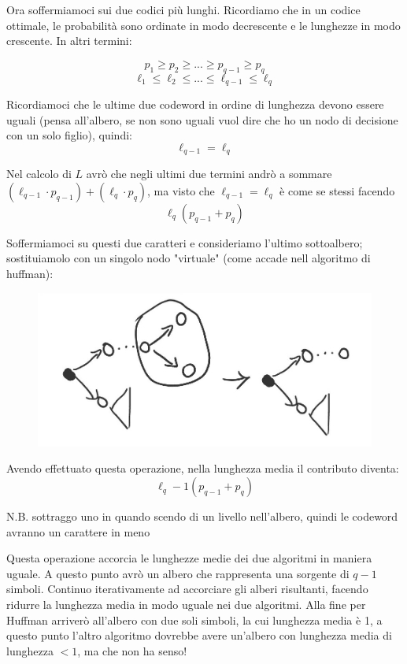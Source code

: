 \begin{dimostrazione}
	Ora soffermiamoci sui due codici più lunghi. Ricordiamo che in un codice ottimale, le probabilità sono ordinate in modo decrescente e le lunghezze in modo crescente. In altri termini:
	
	\begin{equation*}
	p_1 \geq p_2 \geq ... \geq p_{q-1} \geq p_q
	\end{equation*}
		\begin{equation*}
	\ell_1 \leq \ell_2 \leq ... \leq \ell_{q-1} \leq \ell_q
	\end{equation*}
	
	Ricordiamoci che le ultime due codeword in ordine di lunghezza devono essere uguali (pensa all'albero, se non sono uguali vuol dire che ho un nodo di decisione con un solo figlio), quindi:
	\begin{equation*}
	\ell_{q-1} = \ell_{q}
	\end{equation*}
	

	
	Nel calcolo di $L$ avrò che negli ultimi due termini andrò a sommare\\ $(\ell_{q-1} \cdot p_{q-1}) + (\ell_q \cdot p_q)$, ma visto che $\ell_{q-1} = \ell_{q}$ è come se stessi facendo
	\begin{equation*}
	\ell_q(p_{q-1} + p_q)
	\end{equation*}
	
		Soffermiamoci su questi due caratteri e consideriamo l'ultimo sottoalbero; sostituiamolo con un singolo nodo "virtuale" (come accade nell algoritmo di huffman):
	\begin{figure}[h]
		\centering
		\includegraphics[width=0.7\linewidth]{immagini/img21}
	\end{figure}

	Avendo effettuato questa operazione, nella lunghezza media il contributo diventa:
	\begin{equation*}
	\ell_q - 1(p_{q-1} + p_q)
	\end{equation*}
	\begin{center}
		\footnotesize N.B. sottraggo uno in quando scendo di un livello nell'albero, quindi le codeword avranno un carattere in meno
		\normalsize
	\end{center}
	Questa operazione accorcia le lunghezze medie dei due algoritmi in maniera uguale.
	A questo punto avrò un albero che rappresenta una sorgente di $q-1$ simboli.
	Continuo iterativamente ad accorciare gli alberi risultanti, facendo ridurre la lunghezza media in modo uguale nei due algoritmi.
	Alla fine per Huffman arriverò all'albero con due soli simboli, la cui lunghezza media è 1, a questo punto l'altro algoritmo dovrebbe avere un'albero con lunghezza media di lunghezza $<1$, ma che non ha senso!
	

\end{dimostrazione}
